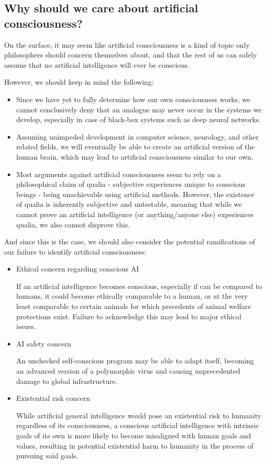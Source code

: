 \documentclass[masterthesis]{fer}
\begin{document}
\subsection{Why should we care about artificial consciousness?}
On the surface, it may seem like artificial consciousness is a kind of topic only philosophers should concern themselves about, and that the rest of us can safely assume that no artificial intelligence will ever be conscious.

However, we should keep in mind the following:
\begin{itemize}
\item{Since we have yet to fully determine how our own consciousness works, we cannot conclusively deny that an analogue may never occur in the systems we develop, especially in case of black-box systems such as deep neural networks.}
\item{Assuming unimpeded development in computer science, neurology, and other related fields, we will eventually be able to create an artificial version of the human brain, which may lead to artificial consciousness similar to our own.}
\item{Most arguments against artificial consciousness seem to rely on a philosophical claim of qualia - subjective experiences unique to conscious beings - being unachievable using artificial methods. However, the existence of qualia is inherently subjective and untestable, meaning that while we cannot prove an artificial intelligence (or anything/anyone else) experiences qualia, we also cannot disprove this.}
\end{itemize}
And since this is the case, we should also consider the potential ramifications of our failure to identify artificial consciousness:
\begin{itemize}
\item{Ethical concern regarding conscious AI}

If an artificial intelligence becomes conscious, especially if can be compared to humans, it could become ethically comparable to a human, or at the very least comparable to certain animals for which precedents of animal welfare protections exist. Failure to acknowledge this may lead to major ethical issues.
\item{AI safety concern}

An unchecked self-conscious program may be able to adapt itself,
becoming an advanced version of a polymorphic virus and causing unprecedented damage to global infrastructure.
\item{Existential risk concern}

While artificial general intelligence would pose an existential risk to humanity regardless of its consciousness, a conscious artificial intelligence with intrinsic goals of its own is more likely to become misaligned with human goals and values, resulting in potential existential harm to humanity in the process of pursuing said goals.
\end{itemize}
\end{document}
